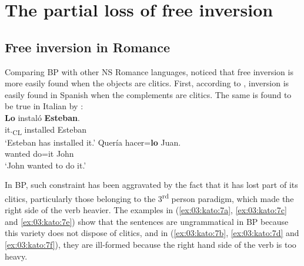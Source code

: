 \documentclass[output=paper,colorlinks,citecolor=brown]{langscibook}
\begin{document}
\section{The partial loss of free inversion}\label{03:sec:kato:2}

\subsection{Free inversion in Romance}\label{03:sec:kato:2.1}

Comparing BP with other NS Romance languages, \citet{kato2000a, kato2000b} noticed that free inversion   is more easily found when the objects are clitics. First, according to \citet{bentivoglio1978}, inversion is easily found in Spanish when the complements are clitics. The same is found to be true in Italian by \citet{beninca1988}:\\

\ea\label{ex:03:kato:5} %
   \ea\label{ex:03:kato:5a}
 \gll \textbf{Lo}    instaló \textbf{Esteban}. \\
           it.\textsubscript{CL} installed Esteban     \\
           \glt ‘Esteban has installed it.’
   \ex\label{ex:03:kato:5b}
 \gll Quería hacer=\textbf{lo} Juan. \\
           wanted do=it John	\\
           \glt ‘John wanted to do it.’
   \z
\z
\ea\label{ex:03:kato:6}
  \label{ex:03:kato:6a}
   \label{ex:03:kato:6b}
   \z
\z

In BP, such constraint has been aggravated by the fact that it has lost part of its clitics, particularly those belonging to the 3\textsuperscript{rd} person paradigm, which made the right side of the verb heavier. The examples in (\ref{ex:03:kato:7a}, \ref{ex:03:kato:7c} and \ref{ex:03:kato:7e})  show that the sentences are ungrammatical in BP because this variety does not dispose of clitics, and in (\ref{ex:03:kato:7b}, \ref{ex:03:kato:7d} and \ref{ex:03:kato:7f}), they are ill-formed because the right hand side of the verb is too heavy.
\end{document}
